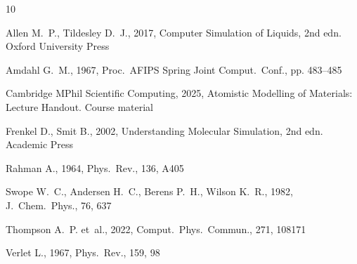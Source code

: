 \documentclass[10pt,twocolumn]{article}
\begin{document}


\begin{thebibliography}{10}

Allen M.~P., Tildesley D.~J., 2017, Computer Simulation of Liquids, 2nd edn.
Oxford University Press

Amdahl G.~M., 1967, Proc.\ AFIPS Spring Joint Comput.\ Conf., pp. 483--485

{Cambridge MPhil Scientific Computing}, 2025, Atomistic Modelling of Materials:
Lecture Handout. Course material

Frenkel D., Smit B., 2002, Understanding Molecular Simulation, 2nd edn.
Academic Press

Rahman A., 1964, Phys.\ Rev., 136, A405

Swope W.~C., Andersen H.~C., Berens P.~H., Wilson K.~R., 1982,
J.\ Chem.\ Phys., 76, 637

Thompson A.~P. et~al., 2022, Comput.\ Phys.\ Commun., 271, 108171

Verlet L., 1967, Phys.\ Rev., 159, 98

\end{thebibliography}
\end{document}

